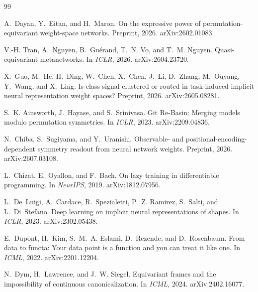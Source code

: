 \documentclass[10pt,twocolumn,letterpaper]{article}
\theoremstyle{definition}
\begin{document}
\small

\begin{thebibliography}{99}

A.~Dayan, Y.~Eitan, and H.~Maron.
\newblock On the expressive power of permutation-equivariant weight-space networks.
\newblock Preprint, 2026. arXiv:2602.01083.

V.-H. Tran, A.~Nguyen, B.~Gu\'erand, T.~N. Vo, and T.~M. Nguyen.
\newblock Quasi-equivariant metanetworks.
\newblock In \emph{ICLR}, 2026. arXiv:2604.23720.

X.~Guo, M.~He, H.~Ding, W.~Chen, X.~Chen, J.~Li, D.~Zhang, M.~Ouyang, Y.~Wang, and X.~Ling.
\newblock Is class signal clustered or routed in task-induced implicit neural representation
weight spaces?
\newblock Preprint, 2026. arXiv:2605.08281.


S.~K. Ainsworth, J.~Hayase, and S.~Srinivasa.
\newblock Git Re-Basin: Merging models modulo permutation symmetries.
\newblock In \emph{ICLR}, 2023. arXiv:2209.04836.

N.~Chiba, S.~Sugiyama, and Y.~Uranishi.
\newblock Observable- and positional-encoding-dependent symmetry readout from neural network
  weights.
\newblock Preprint, 2026. arXiv:2607.03108.

L.~Chizat, E.~Oyallon, and F.~Bach.
\newblock On lazy training in differentiable programming.
\newblock In \emph{NeurIPS}, 2019. arXiv:1812.07956.

L.~De~Luigi, A.~Cardace, R.~Spezialetti, P.~Z. Ramirez, S.~Salti, and L.~Di~Stefano.
\newblock Deep learning on implicit neural representations of shapes.
\newblock In \emph{ICLR}, 2023. arXiv:2302.05438.

E.~Dupont, H.~Kim, S.~M.~A. Eslami, D.~Rezende, and D.~Rosenbaum.
\newblock From data to functa: Your data point is a function and you can treat it like one.
\newblock In \emph{ICML}, 2022. arXiv:2201.12204.

N.~Dym, H.~Lawrence, and J.~W. Siegel.
\newblock Equivariant frames and the impossibility of continuous canonicalization.
\newblock In \emph{ICML}, 2024. arXiv:2402.16077.


\end{thebibliography}
\end{document}
